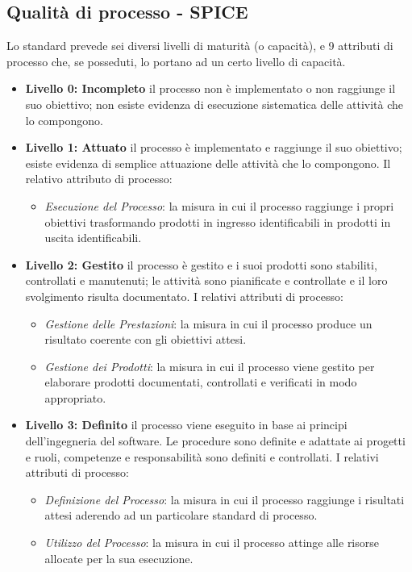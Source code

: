 	\subsection{Qualità di processo - SPICE}
	Lo standard prevede sei diversi livelli di maturità (o capacità), e 9 attributi di processo che, se posseduti, lo portano ad un certo livello di capacità.
	\begin{itemize}
	\item \textbf{Livello 0: Incompleto} il processo non è implementato o non raggiunge il suo obiettivo; non esiste evidenza di esecuzione sistematica delle attività che lo compongono.
	 \item \textbf{Livello 1: Attuato} il processo è implementato e raggiunge il suo obiettivo; esiste evidenza di semplice attuazione delle attività che lo compongono.
	Il relativo attributo di processo:
		\begin{itemize}
			\item \emph{Esecuzione del Processo}: la misura in cui il processo raggiunge i propri obiettivi trasformando   prodotti in ingresso identificabili in prodotti in uscita identificabili.
		\end{itemize}
	\item \textbf{Livello 2: Gestito} il processo è gestito e i suoi prodotti sono stabiliti, controllati e manutenuti; le attività sono pianificate e 			controllate e il loro svolgimento risulta documentato.
	I relativi attributi di processo:
		\begin{itemize}
			\item \emph{Gestione delle Prestazioni}: la misura in cui il processo produce un risultato coerente con gli obiettivi attesi.
			\item \emph{Gestione dei Prodotti}: la misura in cui il processo viene gestito per elaborare prodotti documentati, controllati e verificati in modo appropriato.
		\end{itemize}
	
	\item \textbf{Livello 3: Definito} il processo viene eseguito in base ai principi dell'ingegneria del software. Le procedure sono definite e 				adattate ai progetti e ruoli, competenze e responsabilità sono definiti e controllati.
	I relativi attributi di processo:
		\begin{itemize}
			\item \emph{Definizione del Processo}: la misura in cui il processo raggiunge i risultati attesi aderendo ad un particolare standard di processo.
			\item \emph{Utilizzo del Processo}: la misura in cui il processo attinge alle risorse allocate per la sua esecuzione.	
		\end{itemize}
		

\end{itemize}
